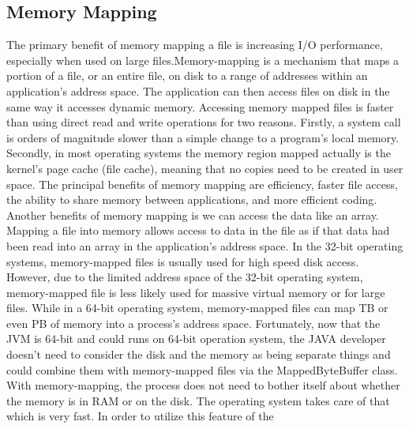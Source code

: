 \documentclass[twocolumn,a4paper,10pt]{article}
\begin{document}
\subsection{Memory Mapping}
The primary benefit of memory mapping a file is increasing I/O performance, especially when used on large files.Memory-mapping is a mechanism that maps a portion of a file, or an entire file, on disk to a range of addresses within an application's address space. The application can then access files on disk in the same way it accesses dynamic memory. Accessing memory mapped files is faster than using direct read and write operations for two reasons. Firstly, a system call is orders of magnitude slower than a simple change to a program's local memory. Secondly, in most operating systems the memory region mapped actually is the kernel's page cache (file cache), meaning that no copies need to be created in user space.\newline
The principal benefits of memory mapping are efficiency, faster file access, the ability to share memory between applications, and more efficient coding. Another benefits of memory mapping is we can access the data like an array. Mapping a file into memory allows access to data in the file as if that data had been read into an array in the application's address space.	\newline
In the 32-bit operating systems, memory-mapped files is usually used for high speed disk access. However, due to the limited address space of the 32-bit operating system, memory-mapped file is less likely used for massive virtual memory or for large files. While in a 64-bit operating system, memory-mapped files can map TB or even PB of memory into a process’s address space.  Fortunately, now that the JVM is 64-bit and could runs on 64-bit operation system, the JAVA developer doesn’t need to consider the disk and the memory as being separate things and could combine them with memory-mapped files via the MappedByteBuffer class. With memory-mapping, the process does not need to bother itself about whether the memory is in RAM or on the disk. The operating system takes care of that which is very fast. In order to utilize this feature of the
\end{document}
